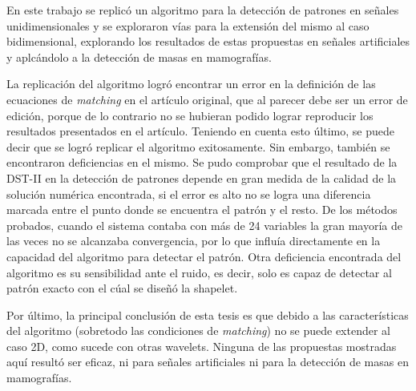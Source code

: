 \begin{conclusions}
	En este trabajo se replicó un algoritmo para la detección de patrones en señales unidimensionales
	y se exploraron vías para la extensión del mismo al caso bidimensional, explorando los resultados 
	de estas propuestas en señales artificiales y aplcándolo a la detección de masas en mamografías.
	
	La replicación del algoritmo logró encontrar un error en la definición de las ecuaciones de \textit{matching}
	en el artículo original, que al parecer debe ser un error de edición, porque de lo contrario no se hubieran
	podido lograr reproducir los resultados presentados en el artículo. Teniendo en cuenta esto último, se puede
	decir que se logró replicar el algoritmo exitosamente. Sin embargo, también se encontraron deficiencias en el
	mismo. Se pudo comprobar que el resultado de la DST-II en la detección de patrones depende en gran medida
	de la calidad de la solución numérica encontrada, si el error es alto no se logra una diferencia marcada
	entre el punto donde se encuentra el patrón y el resto. De los métodos probados, cuando el sistema contaba
	con más de 24 variables la gran mayoría de las veces no se alcanzaba convergencia, por lo que influía 
	directamente en la capacidad del algoritmo para detectar el patrón. Otra deficiencia encontrada del 
	algoritmo es su sensibilidad ante el ruido, es decir, solo es capaz de detectar al patrón exacto con el cúal 
	se diseñó la shapelet. 
	 
	Por último, la principal conclusión de esta tesis es que debido a las características del algoritmo (sobretodo las 
	condiciones de \textit{matching}) 
	no se puede extender al caso 2D, como sucede con otras wavelets. Ninguna de las propuestas mostradas aquí
	resultó ser eficaz, ni para señales artificiales ni para la detección de masas en mamografías.

\end{conclusions}
